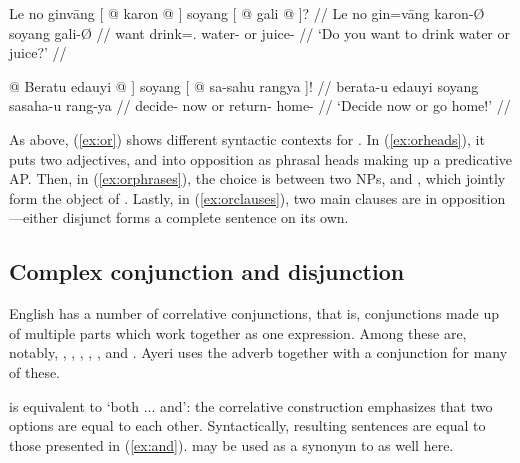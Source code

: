 \a\label{ex:orphrases}\begingl
	\gla Le no ginvāng {\normalfont [} @ karon @ {\normalfont ]} 
		soyang {\normalfont [} @ gali @ {\normalfont ]?} //
	\glb Le no gin=vāng {} karon-Ø {} soyang {} gali-Ø {} //
	\glc \PatTI{} want drink=\Ssg{}.\Aarg{} {} water-\Top{} {} or {} 
		juice-\Top{} {} //
	\glft `Do you want to drink water or juice?' //
\endgl

\a\label{ex:orclauses}\begingl
	\gla {\normalfont [\tsup{S}} @ Beratu edauyi @ {\normalfont ]} soyang
		{\normalfont [} @ sa-sahu rangya {\normalfont ]!} //
	\glb {} berata-u edauyi {} soyang {} sa\til{}saha-u rang-ya {} //
	\glc {} decide-\Imp{} now {} or {} return-\Imp{} home-\Loc{} {} //
	\glft `Decide now or go home!' //
\endgl

\xe

As above, (\ref{ex:or}) shows different syntactic contexts for 
. In (\ref{ex:orheads}), it puts two adjectives, 
 and  into opposition as 
phrasal heads making up a predicative AP. Then, in (\ref{ex:orphrases}), the 
choice is between two NPs,  and 
, which jointly form the object of 
. Lastly, in (\ref{ex:orclauses}), two main 
clauses are in opposition---either disjunct forms a complete sentence on its 
own.


\subsection{Complex conjunction and disjunction}
\label{subsec:corrconj}

English has a number of correlative conjunctions, that is, conjunctions made up
of multiple parts which work together as one expression. Among these are,
notably,
,
,
,
,
, and
.
Ayeri uses the adverb  together with a 
conjunction for many of these.


 is equivalent to 
`both ... and': the correlative construction emphasizes that two options are 
equal to each other. Syntactically, resulting sentences are equal to those
presented in (\ref{ex:and}).  may be used as a synonym 
to  as well here.

